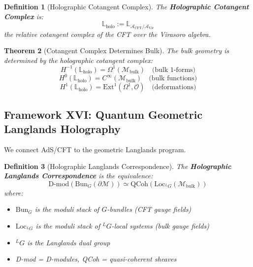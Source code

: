 \documentclass[12pt,a4paper]{article}
\newtheorem{theorem}{Theorem}[section]
\newtheorem{definition}[theorem]{Definition}
\begin{document}
\begin{definition}[Holographic Cotangent Complex]\label{def:holo-cotangent}
The \textbf{Holographic Cotangent Complex} is:
\begin{equation}
\mathbb{L}_{\text{holo}} := \mathbb{L}_{\mathcal{A}_{\text{CFT}}/\mathcal{A}_{\text{Vir}}}
\end{equation}
the relative cotangent complex of the CFT over the Virasoro algebra.
\end{definition}

\begin{theorem}[Cotangent Complex Determines Bulk]\label{thm:cotangent-bulk}
The bulk geometry is determined by the holographic cotangent complex:
\begin{equation}
H^{-1}(\mathbb{L}_{\text{holo}}) = \Omega^1(\mathcal{M}_{\text{bulk}}) \quad \text{(bulk 1-forms)}
\end{equation}
\begin{equation}
H^0(\mathbb{L}_{\text{holo}}) = C^\infty(\mathcal{M}_{\text{bulk}}) \quad \text{(bulk functions)}
\end{equation}
\begin{equation}
H^1(\mathbb{L}_{\text{holo}}) = \text{Ext}^1(\Omega^1, \mathcal{O}) \quad \text{(deformations)}
\end{equation}
\end{theorem}

\subsection{Framework XVI: Quantum Geometric Langlands Holography}

We connect AdS/CFT to the geometric Langlands program.

\begin{definition}[Holographic Langlands Correspondence]\label{def:holo-langlands}
The \textbf{Holographic Langlands Correspondence} is the equivalence:
\begin{equation}
\text{D-mod}(\text{Bun}_G(\partial\mathcal{M})) \simeq \text{QCoh}(\text{Loc}_{{}^L G}(\mathcal{M}_{\text{bulk}}))
\end{equation}
where:
\begin{itemize}
    \item $\text{Bun}_G$ is the moduli stack of $G$-bundles (CFT gauge fields)
    \item $\text{Loc}_{{}^L G}$ is the moduli stack of ${}^L G$-local systems (bulk gauge fields)
    \item ${}^L G$ is the Langlands dual group
    \item D-mod = D-modules, QCoh = quasi-coherent sheaves
\end{itemize}
\end{definition}
\end{document}

